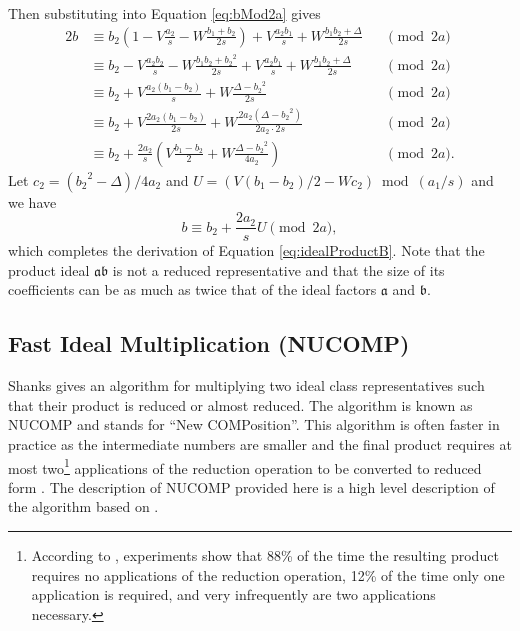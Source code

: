 \documentclass{ucalgthes1}
\theoremstyle{definition}
\begin{document}
\noindent
Then substituting into Equation \eqref{eq:bMod2a} gives
\begin{alignat*}{2}
	b & \equiv b_2(1-V\frac{a_2}{s} - W\frac{b_1+b_2}{2s}) + V\frac{a_2b_1}{s} + W\frac{b_1b_2 + \Delta}{2s} && \pmod{2a} \\
	& \equiv b_2 - V\frac{a_2b_2}{s} - W\frac{b_1b_2+{b_2}^2}{2s} + V\frac{a_2b_1}{s} + W\frac{b_1b_2 + \Delta}{2s} && \pmod{2a} \\
	& \equiv b_2 + V\frac{a_2(b_1-b_2)}{s} + W\frac{\Delta - {b_2}^2}{2s} && \pmod{2a} \\
	& \equiv b_2 + V\frac{2a_2(b_1-b_2)}{2s} + W\frac{2a_2(\Delta - {b_2}^2)}{2a_2 \cdot 2s} && \pmod{2a} \\
	& \equiv b_2 + \frac{2a_2}{s} \left( V\frac{b_1-b_2}{2} + W\frac{\Delta - {b_2}^2}{4a_2} \right) && \pmod{2a}.
\end{alignat*}
Let $c_2 = ({b_2}^2 - \Delta)/4a_2$ and $U = (V(b_1-b_2)/2 - Wc_2) \bmod{(a_1/s)}$ and we have
\[
	b \equiv b_2 + \frac{2a_2}{s} U \pmod{2a},
\]
which completes the derivation of Equation \ref{eq:idealProductB}.  Note that the product ideal $\mathfrak a \mathfrak b$ is not a reduced representative and that the size of its coefficients can be as much as twice that of the ideal factors $\mathfrak a$ and $\mathfrak b$.


\subsection{Fast Ideal Multiplication (NUCOMP)}
\label{subsec:nucomp}

Shanks \cite{Shanks1989} gives an algorithm for multiplying two ideal class representatives such that their product is reduced or almost reduced.  The algorithm is known as NUCOMP and stands for ``New COMPosition''.  This algorithm is often faster in practice as the intermediate numbers are smaller and the final product requires at most two\footnote{According to \cite[p.441]{Jacobson2009}, experiments show that 88\% of the time the resulting product requires no applications of the reduction operation, 12\% of the time only one application is required, and very infrequently are two applications necessary.} applications of the reduction operation to be converted to reduced form \cite[pp.439--441]{Jacobson2009}. The description of NUCOMP provided here is a high level description of the algorithm based on \cite[pp.119-123]{Jacobson2009}.
\end{document}
